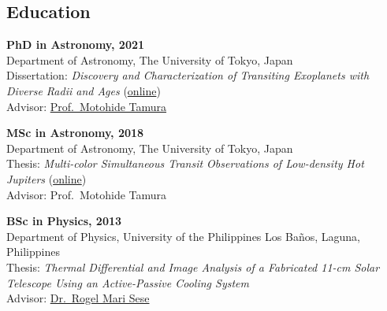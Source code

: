 \documentclass[12pt,letterpaper]{article}
\begin{document}
\subsection{Education}
\begin{list}{}{\cvlist}

    \item
        \textbf{PhD in Astronomy, 2021} \\
        Department of Astronomy, The University of Tokyo, Japan \\
        Dissertation: \textit{Discovery and Characterization of Transiting Exoplanets with Diverse Radii and Ages} (\href{\phdthesisurl}{online}) \\
        Advisor: \href{\tamuraurl}{Prof.\ Motohide Tamura}

    \item
        \textbf{MSc in Astronomy, 2018} \\
        Department of Astronomy, The University of Tokyo, Japan \\
        Thesis: \textit{Multi-color Simultaneous Transit Observations of Low-density Hot Jupiters} (\href{https://github.com/jpdeleon/thesis-master/tree/master}{online}) \\
        Advisor: Prof.\ Motohide Tamura

    \item
        \textbf{BSc in Physics, 2013} \\
        Department of Physics, University of the Philippines Los Ba\~nos, Laguna, Philippines \\
        Thesis: \textit{Thermal Differential and Image Analysis of a Fabricated 11-cm Solar Telescope Using an Active-Passive Cooling System} \\
        Advisor: \href{\seseurl}{Dr.\ Rogel Mari Sese}

\end{list}
\end{document}
